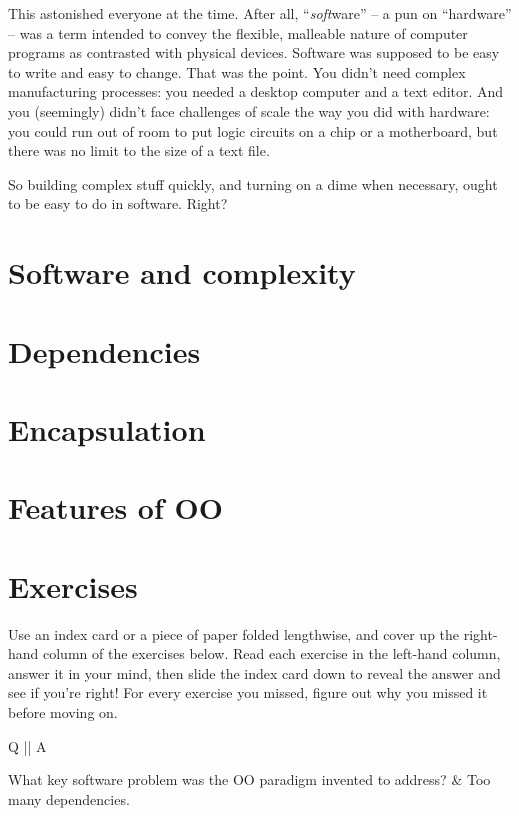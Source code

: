 This astonished everyone at the time. After all, ``\textit{soft}ware'' -- a
pun on ``hardware'' -- was a term intended to convey the flexible, malleable
nature of computer programs as contrasted with physical devices. Software was
supposed to be easy to write and easy to change. That was the point. You
didn't need complex manufacturing processes: you needed a desktop computer and
a text editor. And you (seemingly) didn't face challenges of scale the way you
did with hardware: you could run out of room to put logic circuits on a chip
or a motherboard, but there was no limit to the size of a text file. 

So building complex stuff quickly, and turning on a dime when necessary, ought
to be easy to do in software. Right?

\section{Software and complexity}




\section{Dependencies}

\section{Encapsulation}

\section{Features of OO}

\section{Exercises}

Use an index card or a piece of paper folded lengthwise, and cover up the
right-hand column of the exercises below. Read each exercise in the
left-hand column, answer it in your mind, then slide the index card down to
reveal the answer and see if you're right! For every exercise you missed,
figure out why you missed it before moving on.

\begin{small}
\begin{enumerate}
\begin{longtable}{Q || A}
\hline
\item 
What key software problem was the OO paradigm invented to address?
&
Too many dependencies.
\\
\hline

\end{longtable}
\end{enumerate}
\end{small}
